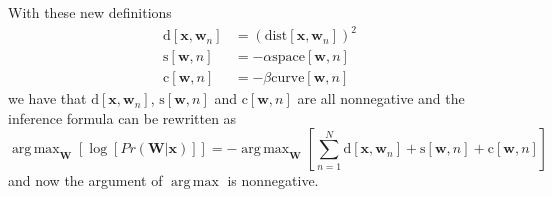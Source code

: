 \documentclass[a4paper,12pt]{article}
\DeclareMathOperator*{\argmax}{arg\,max}
\begin{document}
With these new definitions 
\begin{equation}
\begin{split}
\text{d}[\mathbf{x},\mathbf{w}_n]&=(\text{dist}[\mathbf{x},\mathbf{w}_n])^2\\
\text{s}[\mathbf{w},n]&=-\alpha\text{space}[\mathbf{w},n]\\
\text{c}[\mathbf{w},n]&=-\beta\text{curve}[\mathbf{w},n]
\end{split}
\end{equation}
we have that $\text{d}[\mathbf{x},\mathbf{w}_n]$, $\text{s}[\mathbf{w},n]$ and $\text{c}[\mathbf{w},n]$ are all nonnegative
and the inference formula can be rewritten as
\begin{equation}
\argmax_{\mathbf{W}}[\log{[Pr(\mathbf{W}\vert\mathbf{x})]}] = -\argmax_{\mathbf{W}}[\sum_{n=1}^N \text{d}[\mathbf{x},\mathbf{w}_n]+\text{s}[\mathbf{w},n]+\text{c}[\mathbf{w},n]]
\end{equation}
and now the argument of $\argmax$ is nonnegative.
\end{document}
